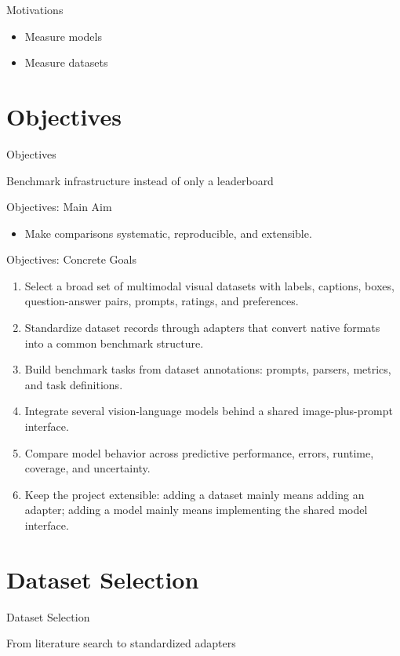 \documentclass[aspectratio=169,11pt]{beamer}
\newcommand{\sectiontitle}[2]{%
\begin{frame}
\vfill
\centering
{\usebeamerfont{title}\color{accent}#1\par}
\vspace{0.5cm}
{\large #2\par}
\vfill
\end{frame}
}
\begin{document}
\begin{frame}{Motivations}
\begin{center}
\Large
\begin{itemize}
    \item Measure models
    \item Measure datasets
\end{itemize}
\end{center}
\end{frame}

\section{Objectives}
\sectiontitle{Objectives}{Benchmark infrastructure instead of only a leaderboard}

\begin{frame}{Objectives: Main Aim}
\begin{itemize}
    \item Make comparisons systematic, reproducible, and extensible.
\end{itemize}
\end{frame}

\begin{frame}{Objectives: Concrete Goals}
\small
\begin{enumerate}
    \item Select a broad set of multimodal visual datasets with labels, captions, boxes, question-answer pairs, prompts, ratings, and preferences.
    \item Standardize dataset records through adapters that convert native formats into a common benchmark structure.
    \item Build benchmark tasks from dataset annotations: prompts, parsers, metrics, and task definitions.
    \item Integrate several vision-language models behind a shared image-plus-prompt interface.
    \item Compare model behavior across predictive performance, errors, runtime, coverage, and uncertainty.
    \item Keep the project extensible: adding a dataset mainly means adding an adapter; adding a model mainly means implementing the shared model interface.
\end{enumerate}
\end{frame}

\section{Dataset Selection}
\sectiontitle{Dataset Selection}{From literature search to standardized adapters}
\end{document}

